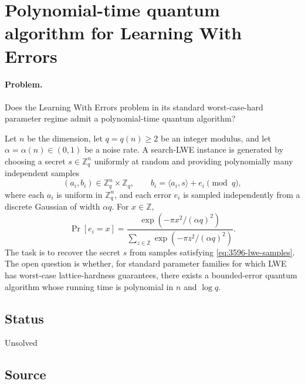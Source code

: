 \section{Polynomial-time quantum algorithm for Learning With Errors}
\label{sec:op_3596f8c955c66d94}

\paragraph{Problem.}
Does the Learning With Errors problem in its standard worst-case-hard
parameter regime admit a polynomial-time quantum algorithm?

Let $n$ be the dimension, let $q=q(n)\geq 2$ be an integer modulus, and let
$\alpha=\alpha(n)\in(0,1)$ be a noise rate.  A search-LWE instance is
generated by choosing a secret $s\in\mathbb Z_q^n$ uniformly at random and
providing polynomially many independent samples
\begin{equation}
  (a_i,b_i)\in\mathbb Z_q^n\times\mathbb Z_q,
  \qquad
  b_i=\langle a_i,s\rangle+e_i\pmod q,
  \label{eq:3596-lwe-samples}
\end{equation}
where each $a_i$ is uniform in $\mathbb Z_q^n$, and each error $e_i$ is
sampled independently from a discrete Gaussian of width $\alpha q$.  For
$x\in\mathbb Z$,
\begin{equation}
  \Pr[e_i=x]=\frac{\exp\left(-\pi x^2/(\alpha q)^2\right)}
    {\sum_{z\in\mathbb Z}\exp\left(-\pi z^2/(\alpha q)^2\right)} .
  \label{eq:3596-lwe-error}
\end{equation}
The task is to recover the secret $s$ from samples satisfying
\eqref{eq:3596-lwe-samples}.  The open question is whether, for standard
parameter families for which LWE has worst-case lattice-hardness
guarantees, there exists a bounded-error quantum algorithm whose running
time is polynomial in $n$ and $\log q$.

\subsection*{Status}

Unsolved

\subsection*{Source}


